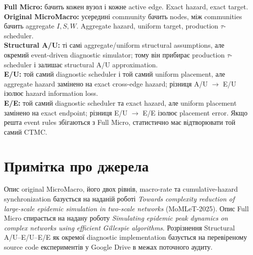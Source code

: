 \documentclass[11pt,a4paper]{article}
\begin{document}
\begin{tcolorbox}[colback=soft,colframe=dark]
\textbf{Full Micro:} бачить кожен вузол і кожне active edge. Exact hazard, exact target.\\[3pt]
\textbf{Original MicroMacro:} усередині community бачить nodes, між communities бачить aggregate $I,S,W$. Aggregate hazard, uniform target, production $\tau$-scheduler.\\[3pt]
\textbf{Structural A/U:} ті самі aggregate/uniform structural assumptions, але окремий event-driven diagnostic simulator; тому він прибирає production $\tau$-scheduler і залишає structural A/U approximation.\\[3pt]
\textbf{E/U:} той самий diagnostic scheduler і той самий uniform placement, але aggregate hazard замінено на exact cross-edge hazard; різниця A/U $\to$ E/U ізолює hazard information loss.\\[3pt]
\textbf{E/E:} той самий diagnostic scheduler та exact hazard, але uniform placement замінено на exact endpoint; різниця E/U $\to$ E/E ізолює placement error. Якщо решта event rules збігаються з Full Micro, статистично має відтворювати той самий CTMC.
\end{tcolorbox}

\section*{Примітка про джерела}
Опис original MicroMacro, його двох рівнів, macro-rate та cumulative-hazard synchronization базується на наданій роботі \textit{Towards complexity reduction of large-scale epidemic simulation in two-scale networks} (MoMLeT-2025). Опис Full Micro спирається на надану роботу \textit{Simulating epidemic peak dynamics on complex networks using efficient Gillespie algorithms}. Розрізнення Structural A/U--E/U--E/E як окремої diagnostic implementation базується на перевіреному source code експериментів у Google Drive в межах поточного аудиту.
\end{document}
